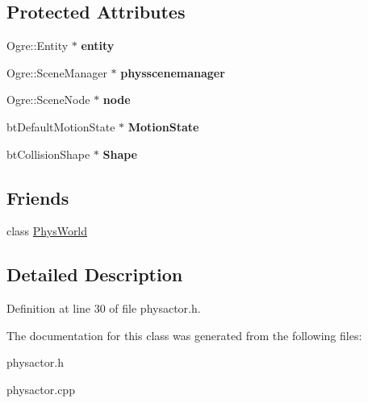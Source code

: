 \subsection*{Protected Attributes}
\begin{DoxyCompactItemize}
\item 
\hypertarget{classActorBase_ada6ceb752605b29357b6c5d53c477696}{
Ogre::Entity $\ast$ {\bfseries entity}}
\label{dd/d7b/classActorBase_ada6ceb752605b29357b6c5d53c477696}

\item 
\hypertarget{classActorBase_ad3739eb7f632f0ceb9397d6c699623cd}{
Ogre::SceneManager $\ast$ {\bfseries physscenemanager}}
\label{dd/d7b/classActorBase_ad3739eb7f632f0ceb9397d6c699623cd}

\item 
\hypertarget{classActorBase_affa8851ae622e1d420afa4770ab89ea4}{
Ogre::SceneNode $\ast$ {\bfseries node}}
\label{dd/d7b/classActorBase_affa8851ae622e1d420afa4770ab89ea4}

\item 
\hypertarget{classActorBase_a3b03d2763602bfa24af9626181bb67db}{
btDefaultMotionState $\ast$ {\bfseries MotionState}}
\label{dd/d7b/classActorBase_a3b03d2763602bfa24af9626181bb67db}

\item 
\hypertarget{classActorBase_aff0d385bc9d30cf053838fd61b32ebad}{
btCollisionShape $\ast$ {\bfseries Shape}}
\label{dd/d7b/classActorBase_aff0d385bc9d30cf053838fd61b32ebad}

\end{DoxyCompactItemize}
\subsection*{Friends}
\begin{DoxyCompactItemize}
\item 
\hypertarget{classActorBase_a375fd37c70c941f0442997a60fdb05c7}{
class \hyperlink{classActorBase_a375fd37c70c941f0442997a60fdb05c7}{PhysWorld}}
\label{dd/d7b/classActorBase_a375fd37c70c941f0442997a60fdb05c7}

\end{DoxyCompactItemize}


\subsection{Detailed Description}


Definition at line 30 of file physactor.h.

The documentation for this class was generated from the following files:\begin{DoxyCompactItemize}
\item 
physactor.h\item 
physactor.cpp\end{DoxyCompactItemize}
